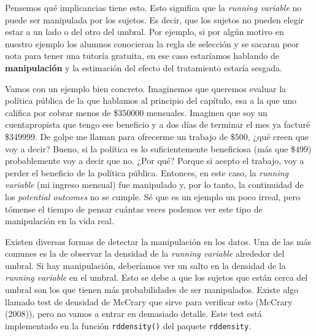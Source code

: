 \documentclass[
  letterpaper,
  DIV=11,
  numbers=noendperiod,
  oneside]{scrreprt}
\begin{document}
Pensemos qué implicancias tiene esto. Esto significa que la
\emph{running variable} no puede ser manipulada por los sujetos. Es
decir, que los sujetos no pueden elegir estar a un lado o del otro del
umbral. Por ejemplo, si por algún motivo en nuestro ejemplo los alumnos
conocieran la regla de selección y se sacaran peor nota para tener una
tutoría gratuita, en ese caso estaríamos hablando de
\textbf{manipulación} y la estimación del efecto del tratamiento estaría
sesgada.

Vamos con un ejemplo bien concreto. Imaginemos que queremos evaluar la
política pública de la que hablamos al principio del capítulo, esa a la
que uno califica por cobrar menos de \$\(350000\) mensuales. Imaginen
que soy un cuentapropista que tengo ese beneficio y a dos días de
terminar el mes ya facturé \$\(349999\). De golpe me llaman para
ofrecerme un trabajo de \$\(500\), ¿qué creen que voy a decir? Bueno, si
la política es lo suficientemente beneficiosa (más que \$\(499\))
probablemente voy a decir que no. ¿Por qué? Porque si acepto el trabajo,
voy a perder el beneficio de la política pública. Entonces, en este
caso, la \emph{running variable} (mi ingreso mensual) fue manipulado y,
por lo tanto, la continuidad de los \emph{potential outcomes} no se
cumple. Sé que es un ejemplo un poco irreal, pero tómense el tiempo de
pensar cuántas veces podemos ver este tipo de manipulación en la vida
real.

Existen diversas formas de detectar la manipulación en los datos. Una de
las más comunes es la de observar la densidad de la \emph{running
variable} alrededor del umbral. Si hay manipulación, deberíamos ver un
salto en la densidad de la \emph{running variable} en el umbral. Esto se
debe a que los sujetos que están cerca del umbral son los que tienen más
probabilidades de ser manipulados. Existe algo llamado test de densidad
de McCrary que sirve para verificar esto (McCrary
(2008)),
pero no vamos a entrar en demasiado detalle. Este test está implementado
en la función \texttt{rddensity()} del paquete \texttt{rddensity}.
\end{document}
